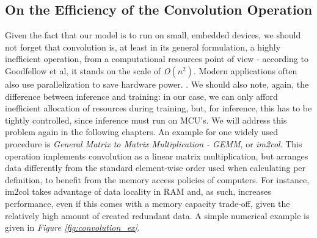 \subsection{On the Efficiency of the Convolution Operation}
Given the fact that our model is to run on small, embedded devices, we should not forget that convolution is, at least in its general formulation, a highly inefficient operation, from a computational resources point of view - according to Goodfellow et al, it stands on the scale of \textit{O\((n^2)\)}. Modern applications often also use parallelization to save hardware power. \cite{Goodfellow-et-al-2016}. We should also note, again, the difference between inference and training: in our case, we can only afford inefficient allocation of resources during training, but, for inference, this has to be tightly controlled, since inference must run on MCU's. We will address this problem again in the following chapters. An example for one widely used procedure is \textit{General Matrix to Matrix Multiplication - GEMM}, or \textit{im2col}. This operation implements convolution as a linear matrix multiplication, but arranges data differently from the standard element-wise order used when calculating per definition, to benefit from the memory access policies of computers. For instance, im2col takes advantage of data locality in RAM and, as such, increases performance, even if this comes with a memory capacity trade-off, given the relatively high amount of created redundant data. \cite{pete_warden_gemm}
A simple numerical example is given in \textit{Figure \ref{fig:convolution_ex}}. 

